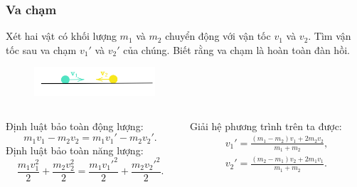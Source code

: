 \begin{frame}
\frametitle{Va chạm}
Xét hai vật có khối lượng \(m_1\) và \(m_2\) chuyển động với vận tốc \(v_1\) và \(v_2\). Tìm vận tốc sau va chạm \(v_1'\) và \(v_2'\) của chúng. Biết rằng va chạm là hoàn toàn đàn hồi.
\begin{figure}
    \centering
    \includegraphics[width=0.4\textwidth]{Content/Figure/collision.png}
\end{figure}
\pause
\begin{columns}
\begin{column}{0.5\textwidth}
\scriptsize
Định luật bảo toàn động lượng:
\begin{equation*}
    m_1 v_1 - m_2 v_2 = m_1 v_1' - m_2 v_2'.
\end{equation*}
Định luật bảo toàn năng lượng:
\begin{equation*}
    \frac{m_1 v_1^2}{2} + \frac{m_2 v_2^2}{2} = \frac{m_1 {v_1'}^2}{2} + \frac{m_2 {v_2'}^2}{2}.
\end{equation*}
\normalsize
\end{column}
\begin{column}{0.5\textwidth}
Giải hệ phương trình trên ta được:
\begin{equation}
    \begin{aligned}
    v_1' = \frac{(m_1 - m_2)v_1 + 2m_2 v_2}{m_1 + m_2},\\
    v_2' = \frac{(m_2 - m_1)v_2 + 2m_1 v_1}{m_1 + m_2}.
    \end{aligned}
\end{equation}
\end{column}
\end{columns}
\end{frame}